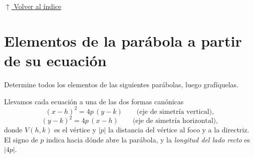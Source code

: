 \documentclass[12pt]{article}
\newcommand{\volverindice}{%
    \vspace{1em}%
    \begin{flushright}%
        \hyperlink{indice}{\small $\uparrow$ Volver al índice}%
    \end{flushright}%
}
\begin{document}
\volverindice
\newpage


\section{Elementos de la parábola a partir de su ecuación}

Determine todos los elementos de las siguientes parábolas, luego grafíquelas.

\vspace{0.5em}
Llevamos cada ecuación a una de las dos formas canónicas
\[
(x-h)^{2}=4p\,(y-k)
\qquad\text{(eje de simetría vertical)},
\]
\[
(y-k)^{2}=4p\,(x-h)
\qquad\text{(eje de simetría horizontal)},
\]
donde $V(h,k)$ es el vértice y $|p|$ la distancia del vértice al foco y a la
directriz. El signo de $p$ indica hacia dónde abre la parábola, y la
\emph{longitud del lado recto} es $|4p|$.
\end{document}
